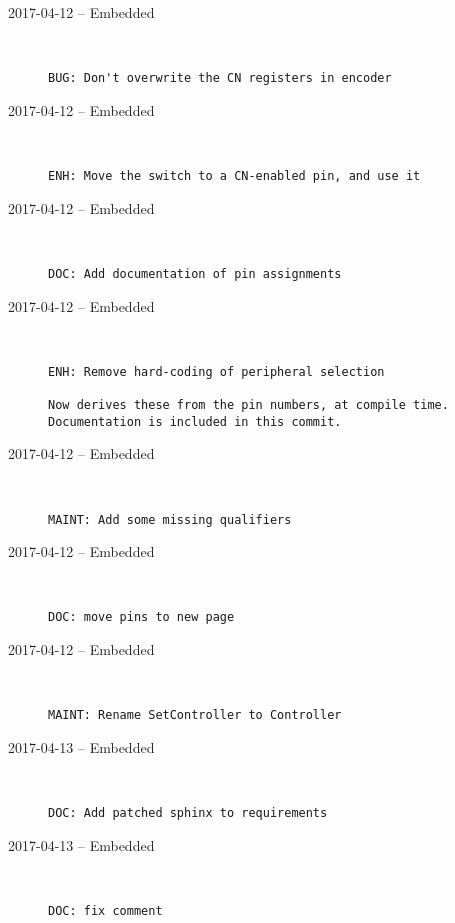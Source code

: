 \begin{description}
  \item[2017-04-12 -- Embedded] \hfill \
\begin{lstlisting}
BUG: Don't overwrite the CN registers in encoder
\end{lstlisting}


  \item[2017-04-12 -- Embedded] \hfill \
\begin{lstlisting}
ENH: Move the switch to a CN-enabled pin, and use it
\end{lstlisting}


  \item[2017-04-12 -- Embedded] \hfill \
\begin{lstlisting}
DOC: Add documentation of pin assignments
\end{lstlisting}


  \item[2017-04-12 -- Embedded] \hfill \
\begin{lstlisting}
ENH: Remove hard-coding of peripheral selection

Now derives these from the pin numbers, at compile time.
Documentation is included in this commit.
\end{lstlisting}


  \item[2017-04-12 -- Embedded] \hfill \
\begin{lstlisting}
MAINT: Add some missing qualifiers
\end{lstlisting}


  \item[2017-04-12 -- Embedded] \hfill \
\begin{lstlisting}
DOC: move pins to new page
\end{lstlisting}


  \item[2017-04-12 -- Embedded] \hfill \
\begin{lstlisting}
MAINT: Rename SetController to Controller
\end{lstlisting}


  \item[2017-04-13 -- Embedded] \hfill \
\begin{lstlisting}
DOC: Add patched sphinx to requirements
\end{lstlisting}


  \item[2017-04-13 -- Embedded] \hfill \
\begin{lstlisting}
DOC: fix comment
\end{lstlisting}



\end{description}
